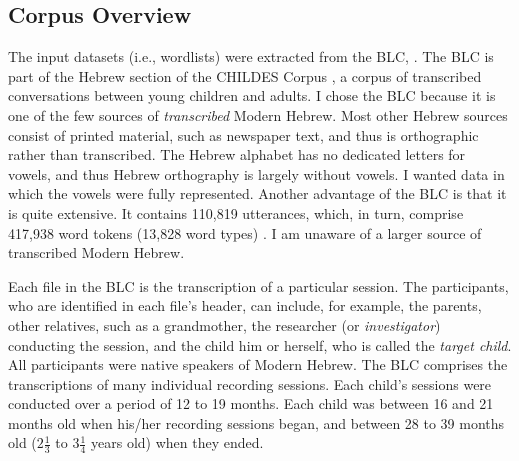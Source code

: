 \subsection{Corpus Overview}
\label{sec:corpus-overview}
The input datasets (i.e., wordlists) were extracted 
from the \ac{BLC}, \citep{berman-weissenborn:1991}. 
The \ac{BLC} is part of the Hebrew section of the 
CHILDES Corpus \citep{macwhinney:2000a}, a corpus 
of transcribed conversations between young children 
and adults. I chose the \ac{BLC} because 
it is one of the few sources of \emph{transcribed} Modern Hebrew. 
Most other Hebrew sources consist of printed material, 
such as newspaper text, and thus is orthographic 
rather than transcribed. The Hebrew alphabet has no 
dedicated letters for vowels, and thus Hebrew 
orthography is largely without vowels. I wanted data in which the vowels were 
fully represented. Another advantage of the \ac{BLC} is that 
it is quite extensive. It contains 110,819 utterances, which, in turn, comprise 417,938 word tokens (13,828 word types) \citep{albert-et-al:2012}.
I am unaware of a larger source of 
transcribed Modern Hebrew. 

Each file in the \ac{BLC} is the transcription of a 
particular session. The participants, who are identified 
in each file's header, can include, for example, the parents,
 other relatives, such as a grandmother, 
the researcher (or \emph{investigator}) conducting the 
session, and the child him or herself, 
who is called the \emph{target child}. All participants 
were native speakers of Modern Hebrew. The \ac{BLC} comprises 
the transcriptions of many individual recording sessions. 
Each child's sessions were conducted over a period of 
12 to 19 months. Each child was between 16 and 21 months 
old when his/her recording sessions began, and between 
28 to 39 months old ($2\frac{1}{3}$ to $3\frac{1}{4}$ 
years old) when they ended.

